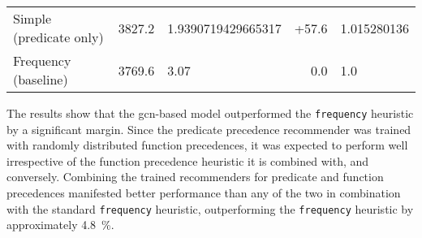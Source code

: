 \begin{table*}[ht]
\begin{tabular}{l|ll|rl}
Simple (predicate only) &
\num{3827.2} &
\num[round-mode=places,round-precision=2]{1.9390719429665317} &
+57.6 &
\num[round-mode=places,round-precision=3]{1.015280136} \\




Frequency (baseline) &
\num{3769.6} &
\num{3.07} &
0.0 &
\num[round-mode=places,round-precision=3]{1.0} \\

\end{tabular}
\end{table*}


The results show that the \gls{gcn}-based model outperformed the \texttt{frequency} heuristic by a significant margin.
Since the predicate precedence recommender was trained with randomly distributed function precedences,
it was expected to perform well irrespective of the function precedence heuristic it is combined with, and conversely.
Combining the trained recommenders for predicate and function precedences manifested better performance
than any of the two in combination with the standard \texttt{frequency} heuristic,
outperforming the \texttt{frequency} heuristic by approximately \SI{4.8}{\percent}.

